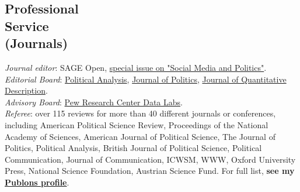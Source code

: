 \documentclass[margin,line,11pt]{resume}
\newcommand{\nl}{\vspace{0.10in}\\}
\begin{document}
\begin{resume}
    
   
    


\section{\mysidestyle Professional\\Service\\(Journals)}

\emph{Journal editor}: SAGE Open, \href{https://journals.sagepub.com/topic/sgo-subjects/3468/sgo}{special issue on "Social Media and Politics"}.\nl
\emph{Editorial Board}: \href{https://www.cambridge.org/core/journals/political-analysis/information/editorial-board}{Political Analysis}, \href{https://www.journals.uchicago.edu/journals/jop/board}{Journal of Politics}, \href{https://journalqd.org/editorialboard}{Journal of Quantitative Description}.\nl
\emph{Advisory Board}: \href{https://www.pewresearch.org/methods/about-data-labs/}{Pew Research Center Data Labs}.\nl
\newpage
\emph{Referee}: over 115 reviews for more than 40 different journals or conferences, including American Political Science Review, Proceedings of the National Academy of Sciences, American Journal of Political Science, The Journal of Politics, Political Analysis, British Journal of Political Science, Political Communication, Journal of Communication, ICWSM, WWW, Oxford University Press, National Science Foundation, Austrian Science Fund. For full list, \textbf{see my \href{https://publons.com/author/1291880/pablo-barbera}{Publons profile}}.


\end{resume}
\end{document}
